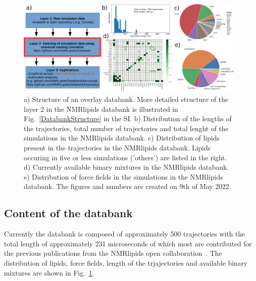 \documentclass[fleqn,10pt]{wlscirep}
\begin{document}

\begin{figure}
    \centering
    \includegraphics[width = 180mm]{Figures/overlay.pdf}
    \caption{a) Structure of an overlay databank. 
    More detailed structure of the layer 2 in the NMRlipids databank is illustrated in Fig.~\ref{DatabankStructure} in the SI.
    b) Distribution of the lengths of the trajectories, total number of trajectories and total lenght of the simulations in the NMRlipids databank.
    c) Distribution of lipids present in the trajectories in the NMRlipids databank. Lipids occuring in five or less simulations ('others') are listed in the right. 
    d) Currently available binary mixtures in the NMRlipids databank. 
    e) Distribution of force fields in the simulations in the NMRlipids databank.
    The figures and numbers are created on 9th of May 2022.}
    \label{fig:overlay}
\end{figure}

\subsection{Content of the databank}
Currently the databank is composed of approximately 500 trajectories with the total length of approximately 231 microseconds of which most are contributed for the previous publications from the NMRlipids open collaboration~\cite{botan15,catte16,antila19,bacle21}. The distribution of lipids, force fields, length of the trjajectories and available binary mixtures are shown in Fig.~\ref{fig:overlay}. 
\end{document}
